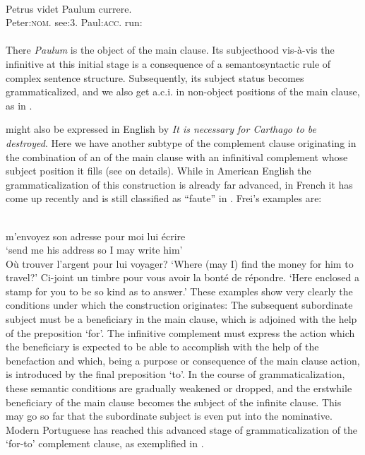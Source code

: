 \ea\label{ex:E33}
\\
\gll Petrus  videt  Paulum  currere.\\
 {Peter:\textsc{nom}.\glsg}  {see:3.\glsg}  {Paul:\textsc{acc}.\glsg}  {run:\glinf}\\
\\
\z
\noindent {}
\noindent There \textit{Paulum} is the object of the main clause. Its subjecthood vis-à-vis the infinitive at this initial stage is a consequence of a semantosyntactic rule of complex sentence structure. Subsequently, its subject status becomes grammaticalized, and we also get a.c.i. in non-object positions of the main clause, as in .

 might also be expressed in English by \textit{It is necessary for Carthago to be destroyed}. Here we have another subtype of the complement clause originating in the combination of an \np of the main clause with an infinitival complement whose subject position it fills (see \citealt[300--306]{Jespersen1940} on details). While in American English the grammaticalization of this construction is already far advanced, in French it has come up recently and is still classified as ``faute'' in \citealt[94]{Frei1929}. Frei's examples are:

\ea\label{ex:E35}
\langinfo{\LangFren}{}{} \\
\ea
  m'envoyez son adresse pour moi lui écrire\\
\glt ‘send me his address so I may write him’\\
\ex Où trouver l'argent pour lui voyager?
\glt ‘Where (may I) find the money for him to travel?’
\ex Ci-joint un timbre pour vous avoir la bonté de répondre.
\glt ‘Here enclosed a stamp for you to be so kind as to answer.’
\z
\z
\noindent These examples show very clearly the conditions under which the construction originates: The subsequent subordinate subject must be a beneficiary in the main clause, which is adjoined with the help of the preposition ‘for’. The infinitive complement must express the action which the beneficiary is expected to be able to accomplish with the help of the benefaction and which, being a purpose or consequence of the main clause action, is introduced by the final preposition ‘to’. In the course of grammaticalization, these semantic conditions are gradually weakened or dropped, and the erstwhile beneficiary \np of the main clause becomes the subject of the infinite clause. This may go so far that the subordinate subject is even put into the nominative.\label{page72} Modern Portuguese has reached this advanced stage of grammaticalization of the ‘for-to’ complement clause, as exemplified in .

